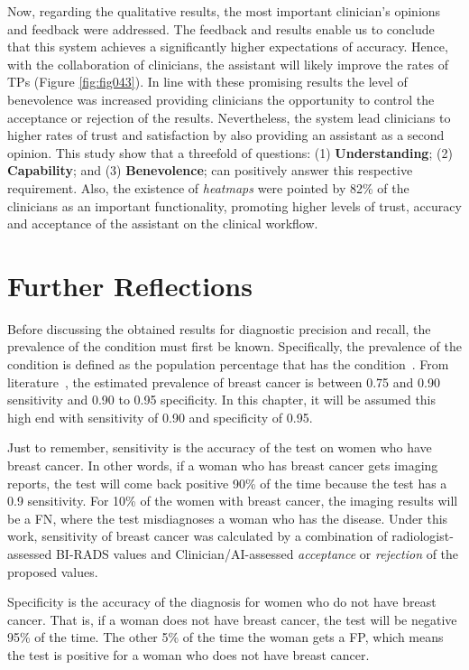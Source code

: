 Now, regarding the qualitative results, the most important clinician's opinions and feedback were addressed.
The feedback and results enable us to conclude that this system achieves a significantly higher expectations of accuracy.
Hence, with the collaboration of clinicians, the assistant will likely improve the rates of \acp{TP} (Figure \ref{fig:fig043}).
In line with these promising results the level of benevolence was increased providing clinicians the opportunity to control the acceptance or rejection of the results.
Nevertheless, the system lead clinicians to higher rates of trust and satisfaction by also providing an assistant as a second opinion.
This study show that a threefold of questions: (1) {\bf Understanding}; (2) {\bf Capability}; and (3) {\bf Benevolence}; can positively answer this respective requirement.
Also, the existence of {\it heatmaps} were pointed by 82\% of the clinicians as an important functionality, promoting higher levels of trust, accuracy and acceptance of the assistant on the clinical workflow.

\section{Further Reflections}
\label{sec:app002005}

Before discussing the obtained results for diagnostic precision and recall, the prevalence of the condition must first be known.
Specifically, the prevalence of the condition is defined as the population percentage that has the condition~\cite{chkotua2017peer}.
From literature~\cite{doi:10.1002/ijc.27711}, the estimated prevalence of breast cancer is between 0.75 and 0.90 sensitivity and 0.90 to 0.95 specificity.
In this chapter, it will be assumed this high end with sensitivity of 0.90 and specificity of 0.95.

Just to remember, sensitivity is the accuracy of the test on women who have breast cancer.
In other words, if a woman who has breast cancer gets imaging reports, the test will come back positive 90\% of the time because the test has a 0.9 sensitivity.
For 10\% of the women with breast cancer, the imaging results will be a \ac{FN}, where the test misdiagnoses a woman who has the disease.
Under this work, sensitivity of breast cancer was calculated by a combination of radiologist-assessed \ac{BI-RADS} values and Clinician/\ac{AI}-assessed {\it acceptance} or {\it rejection} of the proposed values.

Specificity is the accuracy of the diagnosis for women who do not have breast cancer.
That is, if a woman does not have breast cancer, the test will be negative 95\% of the time.
The other 5\% of the time the woman gets a \ac{FP}, which means the test is positive for a woman who does not have breast cancer.

